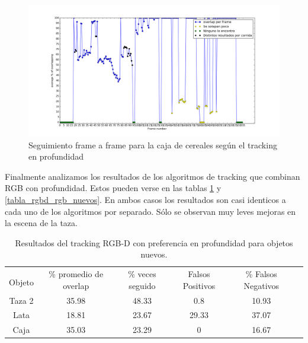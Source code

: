 \begin{figure}
	\centering
	\includegraphics[width=\textwidth]{img/frame_a_frame/depth-caja.png}
	\caption{Seguimiento frame a frame para la caja de cereales según el tracking en profundidad}
	\label{frame_frame_d_nuevo}
\end{figure}


Finalmente analizamos los resultados de los algoritmos de tracking que combinan RGB con profundidad. Estos pueden verse en las tablas \ref{tabla_rgbd_d_nuevos} y \ref{tabla_rgbd_rgb_nuevos}. En ambos casos los resultados son casi identicos a cada uno de los algoritmos por separado. Sólo se observan muy leves mejoras en la escena de la taza. 

\begin{table}[h]
    \begin{tabular}{|c|c|c|c|c|c|}
    \hline
    & \multirow{2}{2.4cm}{\% promedio de overlap} & \multirow{2}{2cm}{\% veces seguido} & \multirow{2}{1.6cm}{Falsos Positivos} & \multirow{2}{1.6cm}{\% Falsos Negativos}\\
	Objeto & & & &\\
    \hline
    Taza 2  & 35.98      & 48.33      & 0.8     & 10.93 \\
    \hline
    Lata    & 18.81      & 23.67      & 29.33   & 37.07 \\
    \hline
    Caja    & 35.03      & 23.29      & 0       & 16.67 \\
    \hline
    \end{tabular}
\caption{Resultados del tracking RGB-D con preferencia en profundidad para objetos nuevos.}
\label{tabla_rgbd_d_nuevos}
\end{table}

